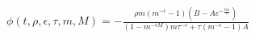 \documentclass{article}
\begin{document}
$\phi (t, \rho, \epsilon, \tau, m, M) = - \frac{\rho m (m^{- \epsilon} - 1)
\left( B - Ae^{- \frac{t m}{\tau}} \right)}{(1 - m^{- \epsilon M}) m \tau^{-
\epsilon} + \tau (m^{- \epsilon} - 1) A}$
\end{document}
